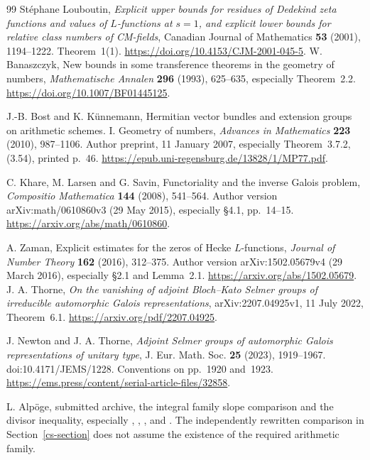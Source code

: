 \begin{thebibliography}{99}
St\'ephane Louboutin,
\emph{Explicit upper bounds for residues of Dedekind zeta functions
and values of $L$-functions at $s=1$, and explicit lower bounds
for relative class numbers of CM-fields},
Canadian Journal of Mathematics \textbf{53} (2001), 1194--1222.
Theorem~1(1).
\url{https://doi.org/10.4153/CJM-2001-045-5}.
W. Banaszczyk, New bounds in some transference theorems
in the geometry of numbers,
\emph{Mathematische Annalen} \textbf{296} (1993), 625--635,
especially Theorem~2.2.
\url{https://doi.org/10.1007/BF01445125}.

J.-B. Bost and K. K\"unnemann,
Hermitian vector bundles and extension groups on arithmetic
schemes. I. Geometry of numbers,
\emph{Advances in Mathematics} \textbf{223} (2010), 987--1106.
Author preprint, 11 January 2007, especially
Theorem~3.7.2, (3.54), printed p.~46.
\url{https://epub.uni-regensburg.de/13828/1/MP77.pdf}.

C. Khare, M. Larsen and G. Savin,
Functoriality and the inverse Galois problem,
\emph{Compositio Mathematica} \textbf{144} (2008), 541--564.
Author version arXiv:math/0610860v3 (29 May 2015),
especially \S4.1, pp.~14--15.
\url{https://arxiv.org/abs/math/0610860}.

A. Zaman, Explicit estimates for the zeros of Hecke
\(L\)-functions,
\emph{Journal of Number Theory} \textbf{162} (2016), 312--375.
Author version arXiv:1502.05679v4 (29 March 2016),
especially \S2.1 and Lemma~2.1.
\url{https://arxiv.org/abs/1502.05679}.
J. A. Thorne, \emph{On the vanishing of adjoint Bloch--Kato
Selmer groups of irreducible automorphic Galois representations},
arXiv:2207.04925v1, 11 July 2022, Theorem~6.1.
\url{https://arxiv.org/pdf/2207.04925}.

J. Newton and J. A. Thorne, \emph{Adjoint Selmer groups of
automorphic Galois representations of unitary type},
J. Eur. Math. Soc. \textbf{25} (2023), 1919--1967.
doi:10.4171/JEMS/1228. Conventions on pp.~1920 and~1923.
\url{https://ems.press/content/serial-article-files/32858}.

L. Alp\"oge, submitted archive, the integral family slope comparison and
the divisor inequality, especially
,
,
,
and
.
The independently rewritten comparison in Section~\ref{cs-section}
does not assume the existence of the required arithmetic family.


\end{thebibliography}
